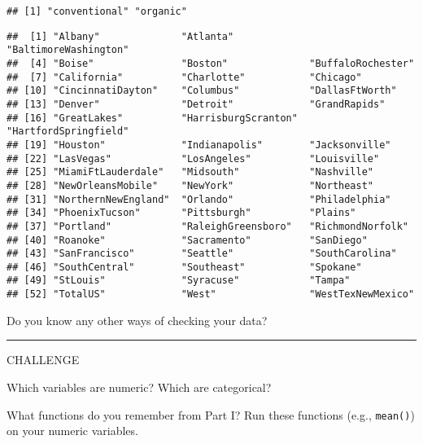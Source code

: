 \documentclass[]{book}
\newenvironment{Shaded}{\begin{snugshade}}{\end{snugshade}}
\newcommand{\KeywordTok}[1]{\textcolor[rgb]{0.13,0.29,0.53}{\textbf{#1}}}
\newcommand{\NormalTok}[1]{#1}
\newcommand{\OperatorTok}[1]{\textcolor[rgb]{0.81,0.36,0.00}{\textbf{#1}}}
\begin{document}
\begin{verbatim}
## [1] "conventional" "organic"
\end{verbatim}

\begin{Shaded}
\end{Shaded}

\begin{verbatim}
##  [1] "Albany"              "Atlanta"             "BaltimoreWashington"
##  [4] "Boise"               "Boston"              "BuffaloRochester"   
##  [7] "California"          "Charlotte"           "Chicago"            
## [10] "CincinnatiDayton"    "Columbus"            "DallasFtWorth"      
## [13] "Denver"              "Detroit"             "GrandRapids"        
## [16] "GreatLakes"          "HarrisburgScranton"  "HartfordSpringfield"
## [19] "Houston"             "Indianapolis"        "Jacksonville"       
## [22] "LasVegas"            "LosAngeles"          "Louisville"         
## [25] "MiamiFtLauderdale"   "Midsouth"            "Nashville"          
## [28] "NewOrleansMobile"    "NewYork"             "Northeast"          
## [31] "NorthernNewEngland"  "Orlando"             "Philadelphia"       
## [34] "PhoenixTucson"       "Pittsburgh"          "Plains"             
## [37] "Portland"            "RaleighGreensboro"   "RichmondNorfolk"    
## [40] "Roanoke"             "Sacramento"          "SanDiego"           
## [43] "SanFrancisco"        "Seattle"             "SouthCarolina"      
## [46] "SouthCentral"        "Southeast"           "Spokane"            
## [49] "StLouis"             "Syracuse"            "Tampa"              
## [52] "TotalUS"             "West"                "WestTexNewMexico"
\end{verbatim}

\leavevmode\hypertarget{question}{}%
Do you know any other ways of checking your data?

\begin{center}\rule{0.5\linewidth}{0.5pt}\end{center}

\leavevmode\hypertarget{challenge}{}%
CHALLENGE

Which variables are numeric? Which are categorical?

What functions do you remember from Part I? Run these functions (e.g., \texttt{mean()}) on your numeric variables.
\end{document}
